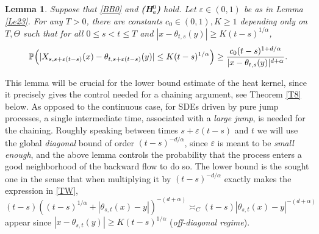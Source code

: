 \documentclass[JEP,XML,SOM,Unicode,published]{cedram}
\theoremstyle{plain}
\newtheorem{lemma}[theorem]{Lemma}
\theoremstyle{definition}
\let\eps\varepsilon
\newcommand\mP{\mathbb{P}}
\newcommand\1{{\mathbf{1}}}
\begin{document}
\begin{lemma}\label{Le26}
Suppose that \eqref{BB0} and {\bf (H$^0_a$)} hold. Let $\eps\in(0,1)$ be as in Lemma \ref{Le23}. For any $T>0$,
there are constants $c_0\in(0,1),K\geq 1$ depending only on $T,\Theta$
such that for all $0\leq s<t\leq T$ and $|x-\theta_{t,s}(y)|\geq K(t-s)^{1/\alpha}$,
\[
\mP\Bigl(|X_{s,s+\eps(t-s)}(x)-\theta_{t,s+\eps(t-s)}(y)|\leq K(t-s)^{1/\alpha}\Bigr)\geq \frac{c_0(t-s)^{1+d/\alpha}}{|x-\theta_{t,s}(y)|^{d+\alpha}}.
\]
\end{lemma}
This lemma will be crucial for the lower bound estimate of the heat kernel, since it precisely gives the control needed for a chaining argument, see Theorem \ref{T8} below. As opposed to the continuous case, for SDEs driven by pure jump processes, a single intermediate time, associated with a \textit{large jump}, is needed for the chaining. Roughly speaking between times $s+\eps(t-s)$ and $t$ we will use the global \textit{diagonal} bound of order $(t-s)^{-d/\alpha} $, since $ \eps$ is meant to be \textit{small enough}, and the above lemma controls the probability that the process enters a good neighborhood of the backward flow to do so. The lower bound is the sought one in the sense that when
multiplying it by $(t-s)^{-d/\alpha}$ exactly makes the expression in \eqref{TW},
$ (t-s)((t-s)^{1/\alpha}+|\theta_{s,t}(x)-y|)^{-(d+\alpha)}\asymp_C (t-s)|\theta_{s,t}(x)-y|^{-(d+\alpha)}$ appear since $|x-\theta_{s,t}(y)|\ge K(t-s)^{1/\alpha} $ (\textit{off-diagonal regime}).
\end{document}
